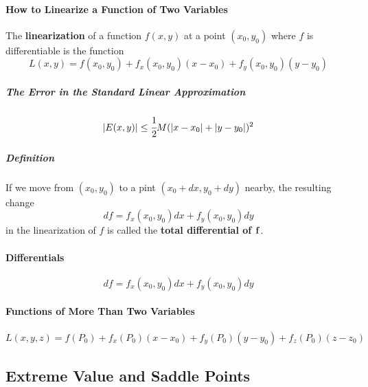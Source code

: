 \documentclass{article}
\begin{document}
            \paragraph{How to Linearize a Function of Two Variables}
                The \textbf{linearization} of a function $f(x,y)$ at a point $(x_0,y_0)$ where $f$ is differentiable is the function
                \[L(x,y)=f(x_0,y_0)+f_x(x_0,y_0)(x-x_0)+f_y(x_0,y_0)(y-y_0)\]
                \subparagraph{The Error in the Standard Linear Approximation}
                \[|E(x,y)|\le\cfrac{1}{2}M(|x-x_0|+|y-y_0|)^2\]
                \subparagraph{Definition} If we move from $(x_0,y_0)$ to a pint $(x_0+dx,y_0+dy)$ nearby, the resulting change
                \[df=f_x(x_0,y_0)dx+f_y(x_0,y_0)dy\]
                in the linearization of $f$ is called the \textbf{total differential of $\bf{f}$}.
            \paragraph{Differentials}
                \[df=f_x(x_0,y_0)dx+f_y(x_0,y_0)dy\]
            \paragraph{Functions of More Than Two Variables}
                \[L(x,y,z)=f(P_0)+f_x(P_0)(x-x_0)+f_y(P_0)(y-y_0)+f_z(P_0)(z-z_0)\]
        \subsection{Extreme Value and Saddle Points}
\end{document}
